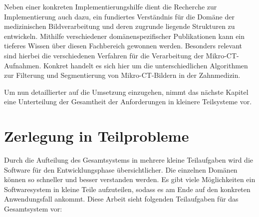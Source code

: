 Neben einer konkreten Implementierungshilfe dient die Recherche zur
Implementierung auch dazu, ein fundiertes Verständnis für die Domäne der medizinischen
Bildverarbeitung und deren zugrunde liegende Strukturen zu entwickeln. Mithilfe
verschiedener domänenspezifischer Publikationen kann ein tieferes Wissen über
diesen Fachbereich gewonnen werden. Besonders relevant sind hierbei die verschiedenen
Verfahren für die Verarbeitung der Mikro-\ac{CT}-Aufnahmen. Konkret handelt es sich
hier um die unterschiedlichen Algorithmen zur Filterung und Segmentierung von Mikro-\ac{CT}-Bildern
in der Zahnmedizin.

Um nun detaillierter auf die Umsetzung einzugehen, nimmt das nächste Kapitel eine
Unterteilung der Gesamtheit der Anforderungen in kleinere Teilsysteme vor.

\section{Zerlegung in Teilprobleme}
\label{sec_zerlegung_in_teilprobleme} Durch die Aufteilung des Gesamtsystems in mehrere
kleine Teilaufgaben wird die Software für den Entwicklungsphase übersichtlicher.
Die einzelnen Domänen können so schneller und besser verstanden werden. Es gibt viele
Möglichkeiten ein Softwaresystem in kleine Teile aufzuteilen, sodass es am Ende
auf den konkreten Anwendungsfall ankommt. Diese Arbeit sieht folgenden Teilaufgaben
für das Gesamtsystem vor:

